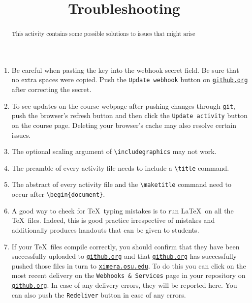 \documentclass{ximera}
\title{Troubleshooting}
\begin{document}
\begin{abstract}
This activity contains some possible solutions
to issues that might arise
\end{abstract}
\maketitle
\begin{enumerate}
\item Be careful when pasting the key into
the webhook secret field. Be sure that no extra
spaces were copied. Push the \verb!Update webhook! button on
\href{http://github.org}{\tt github.org}
after correcting the secret.

\item To see updates on the course webpage
after pushing changes through \verb!git!,
push the browser's refresh button
and then click the \verb!Update activity! button 
on the course page. Deleting your browser's cache
may also resolve certain issues.

\item The optional scaling argument of \verb!\includegraphics!
may not work.

\item The preamble of every activity file needs to 
include a \verb!\title! command. 

\item The abstract of every activity file
and the \verb!\maketitle! command
need to occur after \verb!\begin{document}!.

\item A good way to check for \TeX\ typing mistakes
is to run \LaTeX\ on all the \TeX\ files. Indeed, this
is good practice irrespective of mistakes
and additionally produces handouts that
can be given to students.

\item If your \TeX\ files compile correctly,
you should confirm that they have been successfully uploaded to
\href{http://github.org}{\tt github.org} and that 
\href{http://github.org}{\tt github.org} has successfully
pushed those files in turn to
\href{http://ximera.osu.edu}{\tt ximera.osu.edu}.
To do this you can click on the most recent delivery
on the \verb!Webhooks & Services! page in your repository on
\href{http://github.org}{\tt github.org}.
In case of any delivery errors, they will be reported here.
You can also push the \verb!Redeliver! button
in case of any errors.

\end{enumerate}
\end{document}
